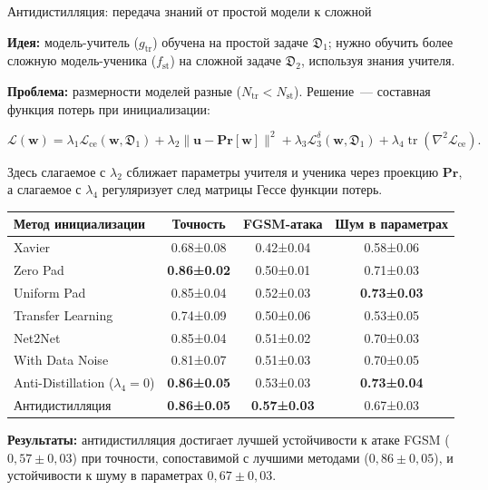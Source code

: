 \documentclass[10pt,pdf,hyperref={unicode}]{beamer}
\begin{document}
\begin{frame}{Антидистилляция: передача знаний от простой модели к сложной}
\justifying
\small

\textbf{Идея:} модель-учитель ($g_{\text{tr}}$) обучена на простой задаче $\mathfrak{D}_1$; нужно обучить более сложную модель-ученика ($f_{\text{st}}$) на сложной задаче $\mathfrak{D}_2$, используя знания учителя.

\textbf{Проблема:} размерности моделей разные ($N_{\text{tr}} < N_{\text{st}}$). Решение~--- составная функция потерь при инициализации:

\[
\mathcal{L}(\mathbf{w}) = \lambda_1\mathcal{L}_{\text{ce}}(\mathbf{w},\mathfrak{D}_1) + \lambda_2\|\mathbf{u}-\mathbf{Pr}[\mathbf{w}]\|^2 + \lambda_3\mathcal{L}_3^{\delta}(\mathbf{w},\mathfrak{D}_1) + \lambda_4\operatorname{tr}(\nabla^2\mathcal{L}_{\text{ce}}).
\]

Здесь слагаемое с $\lambda_2$ сближает параметры учителя и ученика через проекцию $\mathbf{Pr}$, а слагаемое с $\lambda_4$ регуляризует след матрицы Гессе функции потерь.

\begin{small}
\begin{tabular}{|l|c|c|c|}
\hline
\textbf{Метод инициализации} & \textbf{Точность} & \textbf{FGSM-атака} & \textbf{Шум в параметрах} \\
\hline
Xavier & 0.68±0.08 & 0.42±0.04 & 0.58±0.06 \\
Zero Pad & \textbf{0.86±0.02} & 0.50±0.01 & 0.71±0.03 \\
Uniform Pad & 0.85±0.04 & 0.52±0.03 & \textbf{0.73±0.03} \\
Transfer Learning & 0.74±0.09 & 0.50±0.06 & 0.53±0.05 \\
Net2Net & 0.85±0.04 & 0.51±0.02 & 0.70±0.03 \\
With Data Noise & 0.81±0.07 & 0.51±0.03 & 0.70±0.05 \\
Anti-Distillation ($\lambda_4=0$) & \textbf{0.86±0.05} & 0.53±0.03 & \textbf{0.73±0.04} \\
Антидистилляция & \textbf{0.86±0.05} & \textbf{0.57±0.03} & 0.67±0.03 \\
\hline
\end{tabular}
\end{small}

\textbf{Результаты:} антидистилляция достигает лучшей устойчивости к атаке FGSM ($0{,}57 \pm 0{,}03$) при точности, сопоставимой с лучшими методами ($0{,}86 \pm 0{,}05$), и устойчивости к шуму в параметрах $0{,}67 \pm 0{,}03$.
\end{frame}
\end{document}
